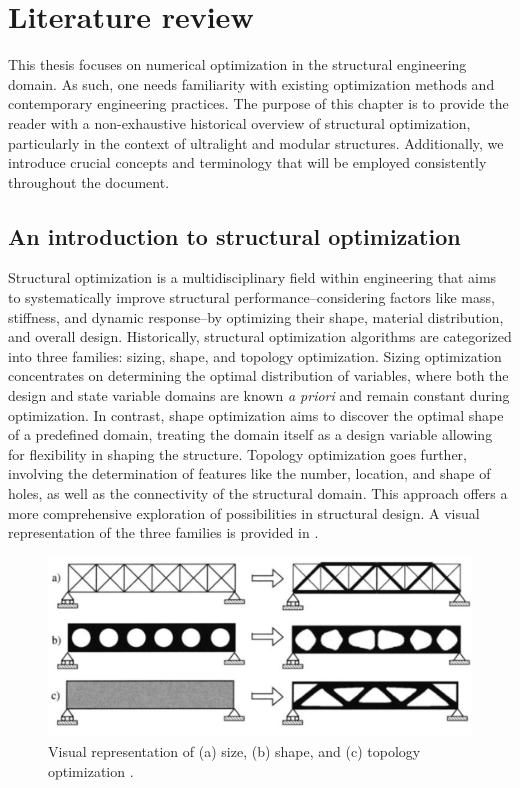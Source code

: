 \setchapterpreamble[u]{\margintoc}
\glsresetall %

\chapter{Literature review} \label{chap:02}
This thesis focuses on numerical optimization in the structural engineering domain. As such, one needs familiarity with existing optimization methods and contemporary engineering practices. The purpose of this chapter is to provide the reader with a non-exhaustive historical overview of structural optimization, particularly in the context of ultralight and modular structures. Additionally, we introduce crucial concepts and terminology that will be employed consistently throughout the document.

\section{An introduction to structural optimization}
Structural optimization is a multidisciplinary field within engineering that aims to systematically improve structural performance--considering factors like mass, stiffness, and dynamic response--by optimizing their shape, material distribution, and overall design. Historically, structural optimization algorithms are categorized into three families: sizing, shape, and topology optimization. Sizing optimization concentrates on determining the optimal distribution of variables, where both the design and state variable domains are known \textit{a priori} and remain constant during optimization. In contrast, shape optimization aims to discover the optimal shape of a predefined domain, treating the domain itself as a design variable allowing for flexibility in shaping the structure. Topology optimization goes further, involving the determination of features like the number, location, and shape of holes, as well as the connectivity of the structural domain. This approach offers a more comprehensive exploration of possibilities in structural design. A visual representation of the three families is provided in .

\begin{figure}
    \centering
    \includegraphics[width=\linewidth]{figures/02_literature/opt_family.png}
    \caption{Visual representation of (a) size, (b) shape, and (c) topology optimization \cite{bendsoe_topology_2004}.}
    \label{fig:02_opt_fam}
\end{figure}

